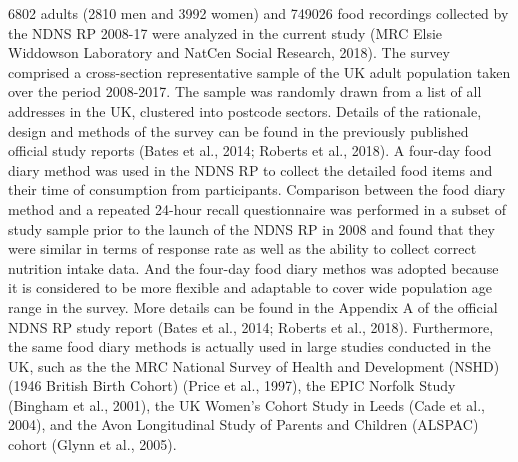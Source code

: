 \documentclass[utf8]{frontiersSCNS}
\begin{document}
6802 adults (2810 men and 3992 women) and 749026 food recordings
collected by the NDNS RP 2008-17 were analyzed in the current study (MRC
Elsie Widdowson Laboratory and NatCen Social Research, 2018). The survey
comprised a cross-section representative sample of the UK adult
population taken over the period 2008-2017. The sample was randomly
drawn from a list of all addresses in the UK, clustered into postcode
sectors. Details of the rationale, design and methods of the survey can
be found in the previously published official study reports (Bates et
al., 2014; Roberts et al., 2018). A four-day food diary method was used
in the NDNS RP to collect the detailed food items and their time of
consumption from participants. Comparison between the food diary method
and a repeated 24-hour recall questionnaire was performed in a subset of
study sample prior to the launch of the NDNS RP in 2008 and found that
they were similar in terms of response rate as well as the ability to
collect correct nutrition intake data. And the four-day food diary
methos was adopted because it is considered to be more flexible and
adaptable to cover wide population age range in the survey. More details
can be found in the Appendix A of the official NDNS RP study report
(Bates et al., 2014; Roberts et al., 2018). Furthermore, the same food
diary methods is actually used in large studies conducted in the UK,
such as the the MRC National Survey of Health and Development (NSHD)
(1946 British Birth Cohort) (Price et al., 1997), the EPIC Norfolk Study
(Bingham et al., 2001), the UK Women's Cohort Study in Leeds (Cade et
al., 2004), and the Avon Longitudinal Study of Parents and Children
(ALSPAC) cohort (Glynn et al., 2005).
\end{document}
